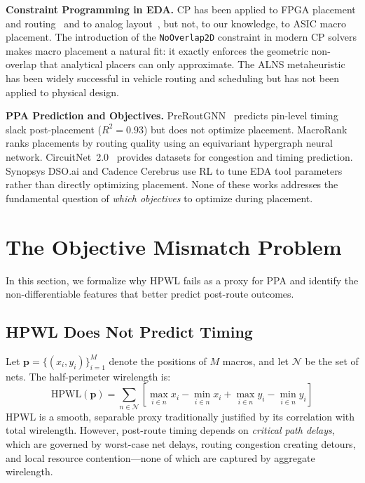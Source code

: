 \documentclass[sigconf,anonymous,review,9pt]{acmart}
\begin{document}
\textbf{Constraint Programming in EDA.}
CP has been applied to FPGA placement and routing~\cite{cpfpga2010} and to analog layout~\cite{cpanalog2015}, but not, to our knowledge, to ASIC macro placement. The introduction of the \texttt{NoOverlap2D} constraint in modern CP solvers makes macro placement a natural fit: it exactly enforces the geometric non-overlap that analytical placers can only approximate. The ALNS metaheuristic~\cite{ropke2006alns, pisinger2019lns} has been widely successful in vehicle routing and scheduling but has not been applied to physical design.

\textbf{PPA Prediction and Objectives.}
PreRoutGNN~\cite{preroutgnn2024} predicts pin-level timing slack post-placement ($R^2 = 0.93$) but does not optimize placement. MacroRank~\cite{macrorank2023} ranks placements by routing quality using an equivariant hypergraph neural network. CircuitNet~2.0~\cite{circuitnet2024} provides datasets for congestion and timing prediction. Synopsys DSO.ai and Cadence Cerebrus use RL to tune EDA tool parameters rather than directly optimizing placement. None of these works addresses the fundamental question of \emph{which objectives} to optimize during placement.


\section{The Objective Mismatch Problem}
\label{sec:mismatch}

In this section, we formalize why HPWL fails as a proxy for PPA and identify the non-differentiable features that better predict post-route outcomes.

\subsection{HPWL Does Not Predict Timing}

Let $\mathbf{p} = \{(x_i, y_i)\}_{i=1}^{M}$ denote the positions of $M$ macros, and let $\mathcal{N}$ be the set of nets. The half-perimeter wirelength is:
\begin{equation}
\text{HPWL}(\mathbf{p}) = \sum_{n \in \mathcal{N}} \left[\max_{i \in n} x_i - \min_{i \in n} x_i + \max_{i \in n} y_i - \min_{i \in n} y_i\right]
\end{equation}
HPWL is a smooth, separable proxy traditionally justified by its correlation with total wirelength. However, post-route timing depends on \emph{critical path delays}, which are governed by worst-case net delays, routing congestion creating detours, and local resource contention---none of which are captured by aggregate wirelength.
\end{document}
